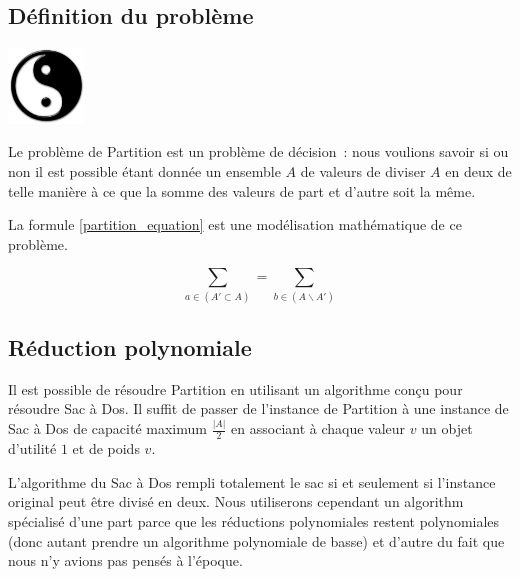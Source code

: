 \subsection{Définition du problème}

\begin{minipage}[b]{0.3\linewidth}
\centering
\includegraphics[height=2cm]{../images/yin_yang.png}
\end{minipage}
\hspace{0.5cm}
\begin{minipage}[b]{0.7\linewidth}
Le problème de Partition est un problème de décision~: nous voulions savoir si ou non il est possible étant donnée un ensemble $A$ de valeurs de diviser $A$ en deux de telle manière à ce que la somme des valeurs de part et d'autre soit la même.
\end{minipage}

La formule \ref{partition_equation} est une modélisation mathématique de ce problème.

\begin{equation}
\sum_{a \in (A' \subset A) } = \sum_{b \in (A \backslash A')}
\label{partition_equation}
\end{equation}

\subsection{Réduction polynomiale}

Il est possible de résoudre Partition en utilisant un algorithme conçu pour résoudre Sac à Dos. Il suffit de passer de l'instance de Partition à une instance de Sac à Dos de capacité maximum $\frac{|A|}{2}$ en associant à chaque valeur $v$ un objet d'utilité $1$ et de poids $v$.

L'algorithme du Sac à Dos rempli totalement le sac si et seulement si l'instance original peut être divisé en deux. Nous utiliserons cependant un algorithm spécialisé d'une part parce que les réductions polynomiales restent polynomiales (donc autant prendre un algorithme polynomiale de basse) et d'autre du fait que nous n'y avions pas pensés à l'époque.  

